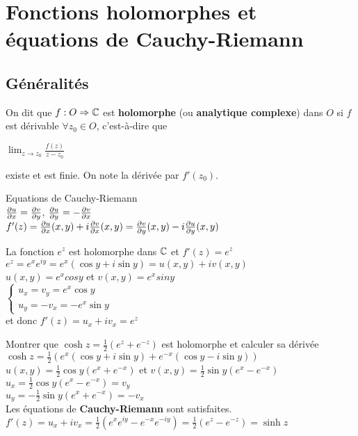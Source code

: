 \chapter[Fonctions holomorphes]{Fonctions holomorphes et équations de Cauchy-Riemann}

\section{Généralités}

\begin{myDefinition}
On dit que 
$f: O\Rightarrow \mathbb{C}$ est 
{\bf holomorphe} (ou {\bf analytique complexe}) 
dans $O$ si $f$ est dérivable 
$\forall z_{0} \in O$, c'est-à-dire que

$ \lim_{z \to z_{0}} \frac{f(z)}{z-z_{0}}$

existe et est finie. On note la dérivée par $f'(z_{0})$.
\end{myDefinition}

\begin{myTheorem} 
Equations de Cauchy-Riemann
\\
${ \partial u \over \partial x } = { \partial v \over \partial y } $, 
${ \partial u \over \partial y } = -{ \partial v \over \partial x } $
\\
$f'(z)={\partial u \over \partial x}(x,y) + i{\partial v \over \partial x}(x,y)={\partial v \over \partial y}(x,y) - i{\partial u \over \partial y}(x,y)$
\end{myTheorem}

\begin{myExample}
	La fonction $e^{z}$ est holomorphe dans $\mathbb{C}$ et $f'(z)=e^{z}$
	\\
	$e^{z}=e^{x}e^{iy}=e^{x}(\cos y + i\sin y)=u(x,y) + iv(x,y)$
	\\
	$u(x,y)= e^{x}cos{y}$ et $v(x,y)= e^{x}sin{y}$
	\\
	$\left\{\begin{matrix}
	u_{x}=v_{y}=e^{x}\cos y 
	\\
	u_{y}=-v_{x}=- e^{x}\sin y 
	\end{matrix}\right.$
	\\
	et donc $f'(z)=u_{x}+iv_{x}=e^{z}$
\end{myExample}

\begin{myExample}
	Montrer que $\cosh{z}=\frac{1}{2}(e^{z}+e^{-z})$ est holomorphe et calculer sa dérivée 
	\\
	$\cosh{z}=\frac{1}{2}(e^{x}(\cos{y} +i\sin{y}) +e^{-x}(\cos{y} - i\sin{y}))$
	\\
	$u(x,y)=\frac{1}{2}\cos{y}(e^{x}+e^{-x})$ et $v(x,y)=\frac{1}{2}\sin{y}(e^{x}-e^{-x})$
	\\
	$u_{x}=\frac{1}{2}\cos{y}(e^{x}-e^{-x}) = v_{y}$
	\\
	$u_{y}=-\frac{1}{2}\sin{y}(e^{x}+e^{-x})= -v_{x}$
	\\
	Les équations de {\bf Cauchy-Riemann} sont satisfaites.
	\\
	$f'(z)=u_{x} + iv_{x} = \frac{1}{2}(e^{x}e^{iy}-e^{-x}e^{-iy})=\frac{1}{2}(e^{z}-e^{-z}) = \sinh{z}$
	
\end{myExample}

